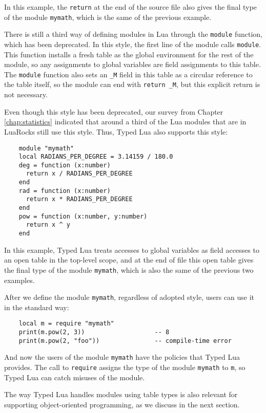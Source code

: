 In this example, the \texttt{return} at the end of the source file
also gives the final type of the module \texttt{mymath}, which is
the same of the previous example.

There is still a third way of defining modules in Lua through the
\texttt{module} function, which has been deprecated.
In this style, the first line of the module calls \texttt{module}.
This function installs a fresh table as the global environment for
the rest of the module, so any assignments to global variables are
field assignments to this table.
The \texttt{module} function also sets an \texttt{\string_M} field
in this table as a circular reference to the table itself,
so the module can end with \texttt{return \string_M},
but this explicit return is not necessary.

Even though this style has been deprecated, our survey from
Chapter \ref{chap:statistics} indicated that around a third of the
Lua modules that are in LuaRocks still use this style.
Thus, Typed Lua also supports this style:
\begin{verbatim}
    module "mymath"
    local RADIANS_PER_DEGREE = 3.14159 / 180.0
    deg = function (x:number)
      return x / RADIANS_PER_DEGREE
    end
    rad = function (x:number)
      return x * RADIANS_PER_DEGREE
    end
    pow = function (x:number, y:number)
      return x ^ y
    end
\end{verbatim}

In this example, Typed Lua treats accesses to global variables as
field accesses to an open table in the top-level scope,
and at the end of file this open table gives the final type of the
module \texttt{mymath}, which is also the same of the previous two
examples.

After we define the module \texttt{mymath}, regardless of adopted style,
users can use it in the standard way:
\begin{verbatim}
    local m = require "mymath"
    print(m.pow(2, 3))                   -- 8
    print(m.pow(2, "foo"))               -- compile-time error
\end{verbatim}

And now the users of the module \texttt{mymath} have the policies that
Typed Lua provides.
The call to \texttt{require} assigns the type of the module \texttt{mymath}
to \texttt{m}, so Typed Lua can catch misuses of the module.

The way Typed Lua handles modules using table types is also
relevant for supporting object-oriented programming, as we discuss in
the next section.

